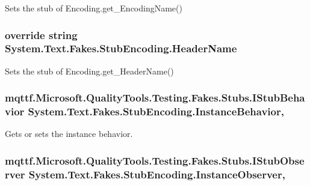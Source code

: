 Sets the stub of Encoding.\-get\-\_\-\-Encoding\-Name()

\hypertarget{class_system_1_1_text_1_1_fakes_1_1_stub_encoding_a1e3230fc3bcbe6f96928f1fa23e49f24}{
\subsubsection[{Header\-Name}]{\setlength{\rightskip}{0pt plus 5cm}override string System.\-Text.\-Fakes.\-Stub\-Encoding.\-Header\-Name\hspace{0.3cm}{\ttfamily [get]}}}\label{class_system_1_1_text_1_1_fakes_1_1_stub_encoding_a1e3230fc3bcbe6f96928f1fa23e49f24}


Sets the stub of Encoding.\-get\-\_\-\-Header\-Name()

\hypertarget{class_system_1_1_text_1_1_fakes_1_1_stub_encoding_a76f2f4c8551602302ff858e68a5629b1}{
\subsubsection[{Instance\-Behavior}]{\setlength{\rightskip}{0pt plus 5cm}mqttf.\-Microsoft.\-Quality\-Tools.\-Testing.\-Fakes.\-Stubs.\-I\-Stub\-Behavior System.\-Text.\-Fakes.\-Stub\-Encoding.\-Instance\-Behavior\hspace{0.3cm}{\ttfamily [get]}, {\ttfamily [set]}}}\label{class_system_1_1_text_1_1_fakes_1_1_stub_encoding_a76f2f4c8551602302ff858e68a5629b1}


Gets or sets the instance behavior.

\hypertarget{class_system_1_1_text_1_1_fakes_1_1_stub_encoding_a19af2ce9dbf779c40466ba4eaf83b384}{
\subsubsection[{Instance\-Observer}]{\setlength{\rightskip}{0pt plus 5cm}mqttf.\-Microsoft.\-Quality\-Tools.\-Testing.\-Fakes.\-Stubs.\-I\-Stub\-Observer System.\-Text.\-Fakes.\-Stub\-Encoding.\-Instance\-Observer\hspace{0.3cm}{\ttfamily [get]}, {\ttfamily [set]}}}\label{class_system_1_1_text_1_1_fakes_1_1_stub_encoding_a19af2ce9dbf779c40466ba4eaf83b384}


